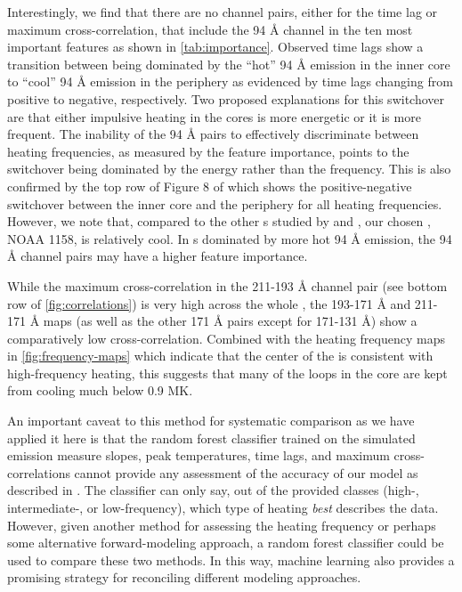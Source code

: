 Interestingly, we find that there are no channel pairs, either for the time lag or maximum cross-correlation, that include the 94 \AA{} channel in the ten most important features as shown in \autoref{tab:importance}.    
Observed time lags \citep{viall_evidence_2012,viall_survey_2017} show a transition between being dominated by the ``hot'' 94 \AA{} emission in the inner core to ``cool'' 94 \AA{}  emission in the periphery as evidenced by time lags changing from positive to negative, respectively.
Two proposed explanations for this switchover are that either impulsive heating in the cores is more energetic or it is more frequent.
The inability of the 94 \AA{} pairs to effectively discriminate between heating frequencies, as measured by the feature importance, points to the switchover being dominated by the energy rather than the frequency.
This is also confirmed by the top row of Figure 8 of  which shows the positive-negative switchover between the inner core and the periphery for all heating frequencies.
However, we note that, compared to the other \AR s studied by \citet{warren_systematic_2012} and , our chosen \AR{}, NOAA 1158, is relatively cool.
In \AR s dominated by more hot 94 \AA{} emission, the 94 \AA{} channel pairs may have a higher feature importance.

While the maximum cross-correlation in the 211-193 \AA{} channel pair (see bottom row of \autoref{fig:correlations}) is very high across the whole \AR{}, the 193-171 \AA{} and 211-171 \AA{} maps (as well as the other 171 \AA{} pairs except for 171-131 \AA{}) show a comparatively low cross-correlation.
Combined with the heating frequency maps in \autoref{fig:frequency-maps} which indicate that the center of the \AR{} is consistent with high-frequency heating, this suggests that many of the loops in the core are kept from cooling much below 0.9 MK.

An important caveat to this method for systematic comparison as we have applied it here is that the random forest classifier trained on the simulated emission measure slopes, peak temperatures, time lags, and maximum cross-correlations cannot provide any assessment of the accuracy of our model as described in .
The classifier can only say, out of the provided classes (high-, intermediate-, or low-frequency), which type of heating \textit{best} describes the data.
However, given another method for assessing the heating frequency or perhaps some alternative forward-modeling approach, a random forest classifier could be used to compare these two methods.
In this way, machine learning also provides a promising strategy for reconciling different modeling approaches.
